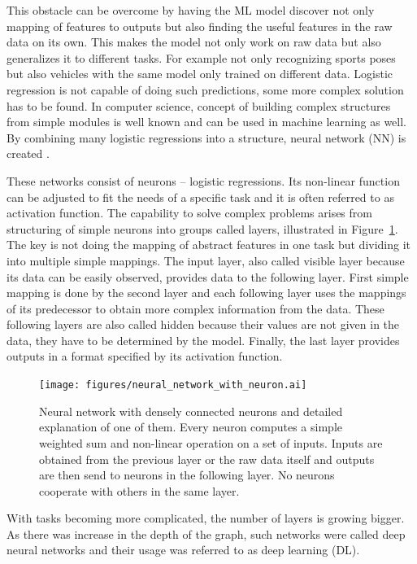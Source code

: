This obstacle can be overcome by having the ML model discover not only mapping of features to outputs but also finding the useful features in the raw data on its own. This makes the model not only work on raw data but also generalizes it to different tasks. For example not only recognizing sports poses but also vehicles with the same model only trained on different data. Logistic regression is not capable of doing such predictions, some more complex solution has to be found. In computer science, concept of building complex structures from simple modules is well known and can be used in machine learning as well. By combining many logistic regressions into a structure, neural network (NN) is created \cite{Goodfellow-et-al-2016}.

These networks consist of neurons -- logistic regressions. Its non-linear function can be adjusted to fit the needs of a specific task and it is often referred to as activation function. The capability to solve complex problems arises from structuring of simple neurons into groups called layers, illustrated in Figure~\ref{fig:network-with-neuron}. The key is not doing the mapping of abstract features in one task but dividing it into multiple simple mappings. The input layer, also called visible layer because its data can be easily observed, provides data to the following layer. First simple mapping is done by the second layer and each following layer uses the mappings of its predecessor to obtain more complex information from the data. These following layers are also called hidden because their values are not given in the data, they have to be determined by the model. Finally, the last layer provides outputs in a format specified by its activation function.

\begin{figure}[ht]\centering
    \centering
    \texttt{[image: figures/neural\_network\_with\_neuron.ai]}
    \caption{Neural network with densely connected neurons and detailed explanation of one of them. Every neuron computes a simple weighted sum and non-linear operation on a set of inputs. Inputs are obtained from the previous layer or the raw data itself and outputs are then send to neurons in the following layer. No neurons cooperate with others in the same layer.}
    \label{fig:network-with-neuron}
\end{figure}

With tasks becoming more complicated, the number of layers is growing bigger. As there was increase in the depth of the graph, such networks were called deep neural networks and their usage was referred to as deep learning (DL).


